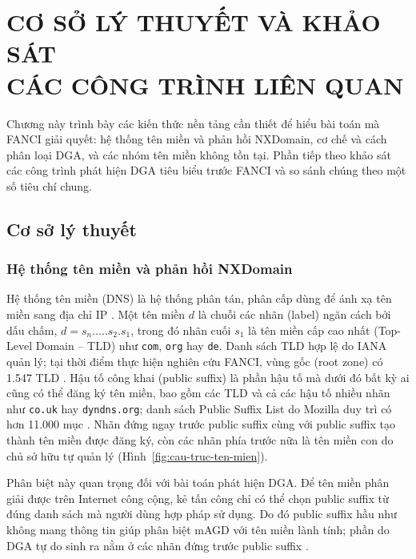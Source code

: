 \section[CƠ SỞ LÝ THUYẾT VÀ KHẢO SÁT CÁC CÔNG TRÌNH LIÊN QUAN]{CƠ SỞ LÝ THUYẾT VÀ KHẢO SÁT\\CÁC CÔNG TRÌNH LIÊN QUAN}\label{chap:co-so-ly-thuyet}

Chương này trình bày các kiến thức nền tảng cần thiết để hiểu bài toán mà FANCI giải quyết: hệ thống tên miền và phản hồi NXDomain, cơ chế và cách phân loại DGA, và các nhóm tên miền không tồn tại. Phần tiếp theo khảo sát các công trình phát hiện DGA tiêu biểu trước FANCI và so sánh chúng theo một số tiêu chí chung.

\subsection{Cơ sở lý thuyết}\label{sec:co-so-ly-thuyet}

\subsubsection{Hệ thống tên miền và phản hồi NXDomain}\label{sec:dns-nxd}

Hệ thống tên miền (DNS) là hệ thống phân tán, phân cấp dùng để ánh xạ tên miền sang địa chỉ IP \cite{rfc1035}. Một tên miền $d$ là chuỗi các nhãn (label) ngăn cách bởi dấu chấm, $d = s_n.\ldots.s_2.s_1$, trong đó nhãn cuối $s_1$ là tên miền cấp cao nhất (Top-Level Domain -- TLD) như \texttt{com}, \texttt{org} hay \texttt{de}. Danh sách TLD hợp lệ do IANA quản lý; tại thời điểm thực hiện nghiên cứu FANCI, vùng gốc (root zone) có 1.547 TLD \cite{schuppen2018fanci}. Hậu tố công khai (public suffix) là phần hậu tố mà dưới đó bất kỳ ai cũng có thể đăng ký tên miền, bao gồm các TLD và cả các hậu tố nhiều nhãn như \texttt{co.uk} hay \texttt{dyndns.org}; danh sách Public Suffix List do Mozilla duy trì có hơn 11.000 mục \cite{publicsuffix,schuppen2018fanci}. Nhãn đứng ngay trước public suffix cùng với public suffix tạo thành tên miền được đăng ký, còn các nhãn phía trước nữa là tên miền con do chủ sở hữu tự quản lý (Hình~\ref{fig:cau-truc-ten-mien}).

Phân biệt này quan trọng đối với bài toán phát hiện DGA. Để tên miền phân giải được trên Internet công cộng, kẻ tấn công chỉ có thể chọn public suffix từ đúng danh sách mà người dùng hợp pháp sử dụng. Do đó public suffix hầu như không mang thông tin giúp phân biệt mAGD với tên miền lành tính; phần do DGA tự do sinh ra nằm ở các nhãn đứng trước public suffix \cite{schuppen2018fanci}.

